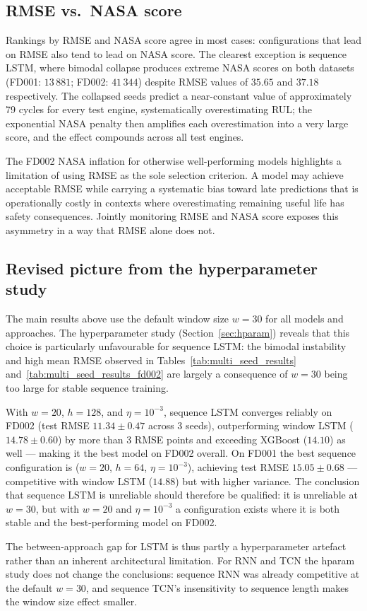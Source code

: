 \documentclass[a4paper,11pt]{article}
\begin{document}
\subsection{RMSE vs.\ NASA score}

Rankings by RMSE and NASA score agree in most cases: configurations that lead on RMSE also tend to lead on NASA score.
The clearest exception is sequence LSTM, where bimodal collapse produces extreme NASA scores on both datasets (FD001: $13\,881$; FD002: $41\,344$) despite RMSE values of $35.65$ and $37.18$ respectively.
The collapsed seeds predict a near-constant value of approximately 79 cycles for every test engine, systematically overestimating RUL; the exponential NASA penalty then amplifies each overestimation into a very large score, and the effect compounds across all test engines.

The FD002 NASA inflation for otherwise well-performing models highlights a limitation of using RMSE as the sole selection criterion.
A model may achieve acceptable RMSE while carrying a systematic bias toward late predictions that is operationally costly in contexts where overestimating remaining useful life has safety consequences.
Jointly monitoring RMSE and NASA score exposes this asymmetry in a way that RMSE alone does not.

\subsection{Revised picture from the hyperparameter study}

The main results above use the default window size $w=30$ for all models and approaches.
The hyperparameter study (Section~\ref{sec:hparam}) reveals that this choice is particularly unfavourable for sequence LSTM: the bimodal instability and high mean RMSE observed in Tables~\ref{tab:multi_seed_results} and~\ref{tab:multi_seed_results_fd002} are largely a consequence of $w=30$ being too large for stable sequence training.

With $w=20$, $h=128$, and $\eta=10^{-3}$, sequence LSTM converges reliably on FD002 (test RMSE $11.34 \pm 0.47$ across 3 seeds), outperforming window LSTM ($14.78 \pm 0.60$) by more than 3 RMSE points and exceeding XGBoost ($14.10$) as well — making it the best model on FD002 overall.
On FD001 the best sequence configuration is ($w=20$, $h=64$, $\eta=10^{-3}$), achieving test RMSE $15.05 \pm 0.68$ — competitive with window LSTM ($14.88$) but with higher variance.
The conclusion that sequence LSTM is unreliable should therefore be qualified: it is unreliable at $w=30$, but with $w=20$ and $\eta=10^{-3}$ a configuration exists where it is both stable and the best-performing model on FD002.

The between-approach gap for LSTM is thus partly a hyperparameter artefact rather than an inherent architectural limitation.
For RNN and TCN the hparam study does not change the conclusions: sequence RNN was already competitive at the default $w=30$, and sequence TCN's insensitivity to sequence length makes the window size effect smaller.
\end{document}
